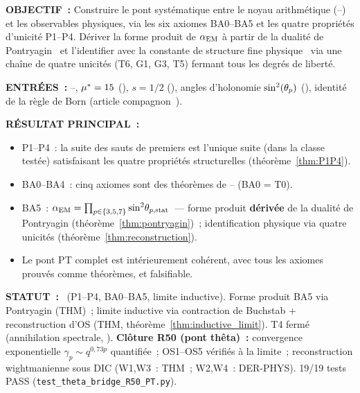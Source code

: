\documentclass[12pt,a4paper]{article}
\begin{document}
\begin{statusbox}
\textbf{OBJECTIF~:}
  Construire le pont systématique entre le noyau arithmétique
  (\cite{companion_M1}--\cite{companion_M3}) et les observables
  physiques, via les six axiomes BA0--BA5 et les quatre propriétés
  d'unicité P1--P4. Dériver la forme produit de $\alpha_{\mathrm{EM}}$ à partir
  de la dualité de
  Pontryagin~\cite{Pontryagin1966,Rudin1962} et l'identifier avec la
  constante de structure fine
  physique~\cite{CODATA2018} via une chaîne de quatre unicités
  (T6, G1, G3, T5) fermant tous les degrés de liberté.

\textbf{ENTRÉES~:}
  \cite{companion_M1}--\cite{companion_M2}, ${\mu^{*}} = 15$
  (\cite{companion_M3}), $s = 1/2$ (\cite{companion_M1}), angles
  d'holonomie $\sin^2(\theta_{p})$ (\cite{companion_M2}), identité de la règle
  de Born (article compagnon~\cite{companion_physics}).

\textbf{RÉSULTAT PRINCIPAL~:}
  \begin{itemize}[nosep]
  \item P1--P4~: la suite des sauts de premiers est l'unique suite
    (dans la classe testée) satisfaisant les quatre propriétés
    structurelles (théorème~\ref{thm:P1P4}).
  \item BA0--BA4~: cinq axiomes sont des théorèmes de
    \cite{companion_M1}--\cite{companion_M3} (BA0 = T0).
  \item BA5~: $\alpha_{\mathrm{EM}} = \prod_{p \in \{3,5,7\}}
    \sin^2\!\theta_{p,\rm stat}$~--- forme produit \textbf{dérivée}
    de la dualité de Pontryagin (théorème~\ref{thm:pontryagin})~;
    identification physique via quatre unicités
    (théorème~\ref{thm:reconstruction}).
  \item Le pont PT complet est intérieurement cohérent, avec tous
    les axiomes prouvés comme théorèmes, et falsifiable.
  \end{itemize}

\textbf{STATUT~:}
  \THMTAG~(P1--P4, BA0--BA5, limite inductive).
  Forme produit BA5 via Pontryagin (THM)~;
  limite inductive via contraction de Buchstab + reconstruction d'OS
  (THM, théorème~\ref{thm:inductive_limit}).
  T4 fermé (annihilation spectrale, \cite{companion_M3}).
  \textbf{Clôture R50 (pont thêta)~:} convergence exponentielle
  $\gamma_p \sim q^{0{,}73p}$ quantifiée~; OS1--OS5 vérifiés à la
  limite~; reconstruction wightmanienne sous DIC (W1,W3~: THM~;
  W2,W4~: DER-PHYS).
  19/19 tests PASS (\texttt{test\_theta\_bridge\_R50\_PT.py}).


\end{statusbox}
\end{document}

